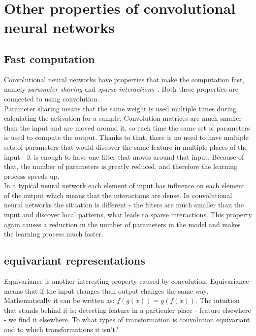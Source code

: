 \documentclass[a4paper,10pt]{report}
\begin{document}
       \section{Other properties of convolutional neural networks}
      
	\subsection{Fast computation}
	  Convolutional neural networks have properties that make the computation fast, namely \emph{parameter sharing} and \emph{sparse interactions}~\cite{BENGIOBOOK}. Both these properties are connected to using convolution.\\
	  
	  Parameter sharing means that the same weight is used multiple times during calculating the activation for a sample.
	  Convolution matrices are much smaller than the input and are moved around it, so each time the same set of parameters is used to compute the output. Thanks to that, there is no need to have multiple sets of parameters that would discover the same feature in multiple places of the input - it is enough to have one filter that moves around that input. Because of that, the number of parameters is greatly reduced, and therefore the learning process speeds up.\\
	  
	  In a typical neural network each element of input has influence on each element of the output which means that the interactions are dense. In convolutional neural networks the situation is different - the filters are much smaller than the input and discover local patterns, what leads to sparse interactions. This property again causes a reduction in the number of parameters in the model and makes the learning process much faster.\\	
	  
	\subsection{equivariant representations} %
	  Equivariance is another interesting property caused by convolution. Equivariance means that if the input changes than output changes the same way. Mathematically it can be written as: $f(g(x)) = g(f(x))$. The intuition that stands behind it is: detecting feature in a particuler place - feature elsewhere - we find it elsewhere. To what types of transformation is convolution equivariant and to which transformations it isn`t?\\
	
\end{document}
